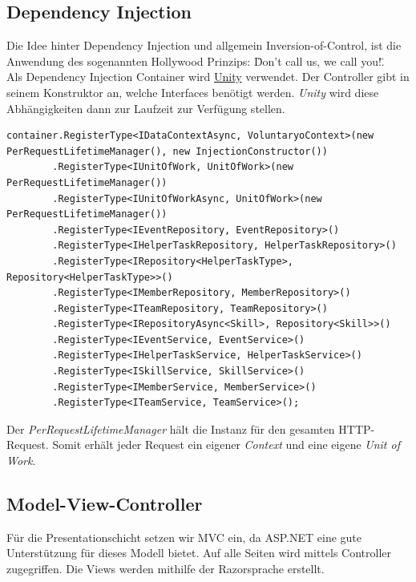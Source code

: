 	\subsection{Dependency Injection}
		Die Idee hinter Dependency Injection und allgemein Inversion-of-Control, ist die Anwendung des sogenannten Hollywood Prinzips: \"Don’t call us, we call you!\". 
		\\Als Dependency Injection Container wird \href{http://unity.codeplex.com/}{Unity} verwendet. Der Controller gibt in seinem Konstruktor an, welche Interfaces benötigt werden. \textit{Unity} wird diese Abhängigkeiten dann zur Laufzeit zur Verfügung stellen.
		\begin{lstlisting}[language=CSharp, caption=UnityConfig.cs, label=lst:unityconfig, firstnumber=1]
	container.RegisterType<IDataContextAsync, VoluntaryoContext>(new PerRequestLifetimeManager(), new InjectionConstructor())
	    .RegisterType<IUnitOfWork, UnitOfWork>(new PerRequestLifetimeManager())
	    .RegisterType<IUnitOfWorkAsync, UnitOfWork>(new PerRequestLifetimeManager())
	    .RegisterType<IEventRepository, EventRepository>()
	    .RegisterType<IHelperTaskRepository, HelperTaskRepository>()
	    .RegisterType<IRepository<HelperTaskType>, Repository<HelperTaskType>>()
	    .RegisterType<IMemberRepository, MemberRepository>()
	    .RegisterType<ITeamRepository, TeamRepository>()
	    .RegisterType<IRepositoryAsync<Skill>, Repository<Skill>>()
	    .RegisterType<IEventService, EventService>()
	    .RegisterType<IHelperTaskService, HelperTaskService>()
	    .RegisterType<ISkillService, SkillService>()
	    .RegisterType<IMemberService, MemberService>()
	    .RegisterType<ITeamService, TeamService>();
	    \end{lstlisting}
	    Der \textit{PerRequestLifetimeManager} hält die Instanz für den gesamten HTTP-Request. Somit erhält jeder Request ein eigener \textit{Context} und eine eigene \textit{Unit of Work}.

	\subsection{Model-View-Controller}
		Für die Presentationschicht setzen wir MVC ein, da ASP.NET eine gute Unterstützung für dieses Modell bietet. Auf alle Seiten wird mittels Controller zugegriffen. Die Views werden mithilfe der Razorsprache erstellt.

